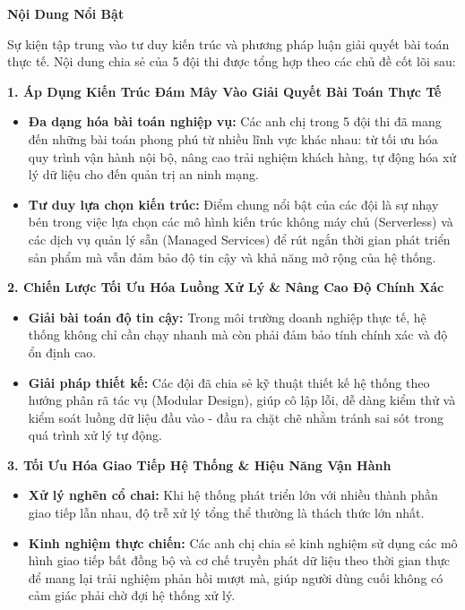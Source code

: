 \vspace{0.5em}\noindent\textbf{Nội Dung Nổi Bật}

Sự kiện tập trung vào tư duy kiến trúc và phương pháp luận giải quyết
bài toán thực tế. Nội dung chia sẻ của 5 đội thi được tổng hợp theo các
chủ đề cốt lõi sau:

\vspace{0.5em}\noindent\textbf{1. Áp Dụng Kiến Trúc Đám Mây Vào Giải Quyết Bài Toán Thực Tế}

\begin{itemize}
\tightlist
\item
  \textbf{Đa dạng hóa bài toán nghiệp vụ:} Các anh chị trong 5 đội thi
  đã mang đến những bài toán phong phú từ nhiều lĩnh vực khác nhau: từ
  tối ưu hóa quy trình vận hành nội bộ, nâng cao trải nghiệm khách hàng,
  tự động hóa xử lý dữ liệu cho đến quản trị an ninh mạng.
\item
  \textbf{Tư duy lựa chọn kiến trúc:} Điểm chung nổi bật của các đội là
  sự nhạy bén trong việc lựa chọn các mô hình kiến trúc không máy chủ
  (Serverless) và các dịch vụ quản lý sẵn (Managed Services) để rút ngắn
  thời gian phát triển sản phẩm mà vẫn đảm bảo độ tin cậy và khả năng mở
  rộng của hệ thống.
\end{itemize}

\vspace{0.5em}\noindent\textbf{2. Chiến Lược Tối Ưu Hóa Luồng Xử Lý \& Nâng Cao Độ Chính
Xác}

\begin{itemize}
\tightlist
\item
  \textbf{Giải bài toán độ tin cậy:} Trong môi trường doanh nghiệp thực
  tế, hệ thống không chỉ cần chạy nhanh mà còn phải đảm bảo tính chính
  xác và độ ổn định cao.
\item
  \textbf{Giải pháp thiết kế:} Các đội đã chia sẻ kỹ thuật thiết kế hệ
  thống theo hướng phân rã tác vụ (Modular Design), giúp cô lập lỗi, dễ
  dàng kiểm thử và kiểm soát luồng dữ liệu đầu vào - đầu ra chặt chẽ
  nhằm tránh sai sót trong quá trình xử lý tự động.
\end{itemize}

\vspace{0.5em}\noindent\textbf{3. Tối Ưu Hóa Giao Tiếp Hệ Thống \& Hiệu Năng Vận Hành}

\begin{itemize}
\tightlist
\item
  \textbf{Xử lý nghẽn cổ chai:} Khi hệ thống phát triển lớn với nhiều
  thành phần giao tiếp lẫn nhau, độ trễ xử lý tổng thể thường là thách
  thức lớn nhất.
\item
  \textbf{Kinh nghiệm thực chiến:} Các anh chị chia sẻ kinh nghiệm sử
  dụng các mô hình giao tiếp bất đồng bộ và cơ chế truyền phát dữ liệu
  theo thời gian thực để mang lại trải nghiệm phản hồi mượt mà, giúp
  người dùng cuối không có cảm giác phải chờ đợi hệ thống xử lý.
\end{itemize}

